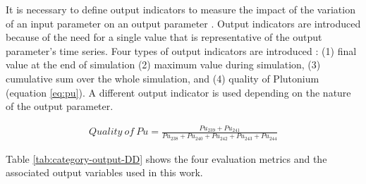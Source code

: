 It is necessary to define output indicators to measure the 
impact of the variation of an input parameter on an output 
parameter \cite{noauthor_effects_2017}. 
Output indicators are introduced because of the need for a single value that 
is representative of the output parameter's time series.  
Four types of output indicators are introduced 
\cite{noauthor_effects_2017}: 
(1) final value at the end of simulation
(2) maximum value during simulation,  
(3) cumulative sum over the whole simulation, and 
(4) quality of Plutonium (equation \ref{eq:pu}). 
A different output indicator is used depending on 
the nature of the output parameter.

\begin{align}
    \label{eq:pu}
Quality\ of\ Pu = \frac{Pu_{239}+Pu_{241}}{Pu_{238}+Pu_{240}+Pu_{242}+Pu_{243}+Pu_{244}}
\end{align}

Table \ref{tab:category-output-DD} shows the four evaluation 
metrics and the associated output variables used in this work. 

